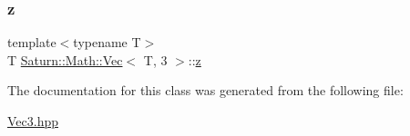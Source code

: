 \mbox{\label{class_saturn_1_1_math_1_1_vec_3_01_t_00_013_01_4_af2f3567df19bf4323973a2b0fd217cad}} 
\subsubsection{\texorpdfstring{z}{z}}
{\footnotesize\ttfamily template$<$typename T$>$ \\
T \mbox{\hyperlink{class_saturn_1_1_math_1_1_vec}{Saturn\+::\+Math\+::\+Vec}}$<$ T, 3 $>$\+::\mbox{\hyperlink{glad_8h_a1c599441d9dece861ee2cd70e31ce120}{z}}}



The documentation for this class was generated from the following file\+:\begin{DoxyCompactItemize}
\item 
\mbox{\hyperlink{_vec3_8hpp}{Vec3.\+hpp}}\end{DoxyCompactItemize}
